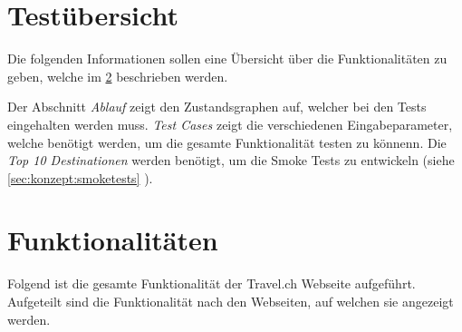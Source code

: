 
\appendix
\chapter{Testübersicht}
\label{app:Testfälle}
Die folgenden Informationen sollen eine Übersicht über die Funktionalitäten zu geben, welche im  \cref{app:Funktionalitäten}  beschrieben werden.

Der Abschnitt \textit{Ablauf} zeigt den Zustandsgraphen auf, welcher bei den Tests eingehalten werden muss. \textit{Test Cases} zeigt die verschiedenen Eingabeparameter, welche benötigt werden, um die gesamte Funktionalität testen zu könnenn. Die \textit{Top 10 Destinationen} werden benötigt, um die Smoke Tests zu entwickeln (siehe \cref{sec:konzept:smoketests} ).







\chapter{Funktionalitäten}
\label{app:Funktionalitäten}
Folgend ist die gesamte Funktionalität der Travel.ch Webseite aufgeführt. Aufgeteilt sind die Funktionalität nach den Webseiten, auf welchen sie angezeigt werden.

